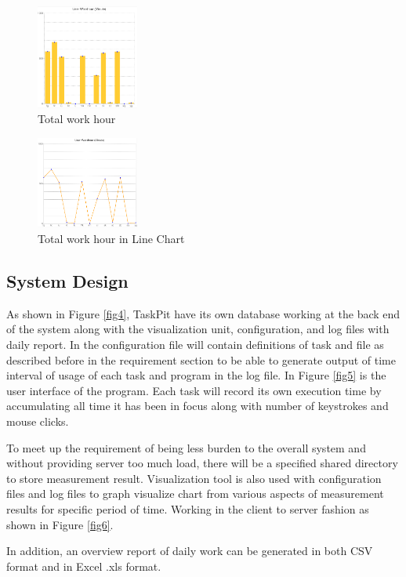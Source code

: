 \documentclass [paper]{ieice}
\begin{document}
\begin{figure}[h]
	\centering	
\includegraphics[width=0.3\textwidth]{fig2}
	\caption{Total work hour}
	\label{fig2}
\end{figure}

\begin{figure}[h]
	\centering	
\includegraphics[width=0.3\textwidth]{fig3}
	\caption{Total work hour in Line Chart}
	\label{fig3}
\end{figure}
	
\subsection{System Design}
	As shown in Figure \ref{fig4}, TaskPit have its own database working at the back end of the system along with the visualization unit, configuration, and log files with daily report. In the configuration file will contain definitions of task and file as described before in the requirement section to be able to generate output of time interval of usage of each task and program in the log file. In Figure \ref{fig5} is the user interface of the program. Each task will record its own execution time by accumulating all time it has been in focus along with number of keystrokes and mouse clicks. \par
	To meet up the requirement of being less burden to the overall system and without providing server too much load, there will be a specified shared directory to store measurement result. Visualization tool is also used with configuration files and log files to graph visualize chart from various aspects of measurement results for specific period of time. Working in the client to server fashion as shown in Figure \ref{fig6}. \par
	In addition, an overview report of daily work can be generated in both CSV format and in Excel .xls format. \par
	
\end{document}
